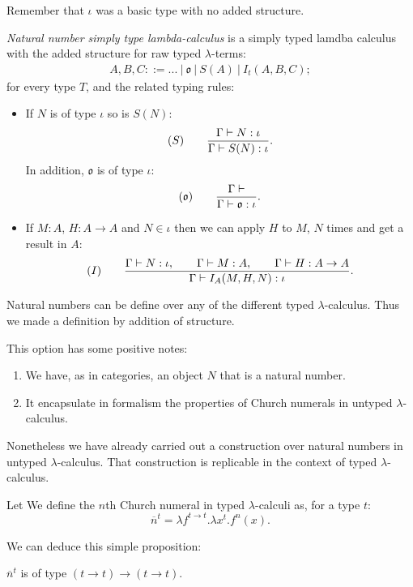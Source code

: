 \begin{remark}
  Remember that $\iota$ was a basic type with no added structure.
\end{remark}
\begin{definition}
  \emph{Natural number simply type lambda-calculus} is a simply typed lamdba calculus with the added structure for raw typed $\lambda$-terms:
  \begin{align*}
    A,B, C ::= ...\ |\ \mathfrak{o}\ |\ S(A)\ |\ I_t(A,B,C);
  \end{align*}
for every type $T$, and the related typing rules:
  \begin{itemize}
  \item If $N$ is of type $\iota$ so is $S(N)$:
    $$  (S)\qquad  {\displaystyle\Gamma \vdash N:\iota \over \Gamma \vdash S(N):\iota}.$$
    In addition, $\mathfrak{o}$ is of type $\iota$:
    $$  (\mathfrak{o})\qquad  {\displaystyle\Gamma \vdash \over \Gamma \vdash \mathfrak{o}:\iota}.$$
  \item If $M: A$, $H: A\to A$ and $N\in \iota$ then we can apply $H$ to $M$, $N$ times and get a result in $A$:
        $$  (I)\qquad  {\displaystyle\Gamma \vdash N:\iota, \qquad \Gamma \vdash M:A,\qquad \Gamma \vdash H:A\to A \over \Gamma \vdash I_A(M,H,N):\iota}.$$
  \end{itemize}
\end{definition}

\begin{remark}
  Natural numbers can be define over any of the different typed $\lambda$-calculus. Thus we made a definition by addition of structure. 
\end{remark}

This option has some positive notes:
\begin{enumerate}
\item We have, as in categories, an object $N$ that is a natural number.
\item It encapsulate in formalism the properties of Church numerals in untyped $\lambda$-calculus.
\end{enumerate}

Nonetheless we have already carried out a construction over natural numbers in untyped $\lambda$-calculus. That construction is replicable in the context of typed $\lambda$-calculus.

\begin{definition}
  Let We define the $n$th Church numeral in typed $\lambda$-calculi as, for a type $t$:
  $$\overline n^t = \lambda f^{t \to t}. \lambda x^{t}. f^{n}(x).$$
  
\end{definition}
We can deduce this simple proposition:
\begin{proposition}
  $\overline n^t$ is of type $(t\to t)\to(t\to t)$.
\end{proposition}

